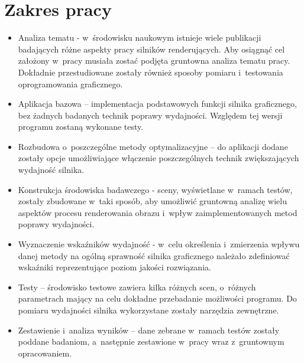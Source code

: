 \documentclass[a4paper,twoside,12pt]{book}
\begin{document}
\section{Zakres pracy}
\begin{itemize}
    \item Analiza tematu - w~środowisku naukowym istnieje wiele publikacji badających różne aspekty pracy silników renderujących. Aby osiągnąć cel założony w~pracy musiała zostać podjęta gruntowna analiza tematu pracy. Dokładnie przestudiowane zostały również sposoby pomiaru i~testowania oprogramowania graficznego.
    \item Aplikacja bazowa – implementacja podstawowych funkcji silnika graficznego, bez żadnych badanych technik poprawy wydajności. Względem tej wersji programu zostaną wykonane testy.
    \item Rozbudowa o~poszczególne metody optymalizacyjne – do aplikacji dodane zostały opcje umożliwiające włączenie poszczególnych technik zwiększających wydajność silnika.
    \item Konstrukcja środowiska badawczego - sceny, wyświetlane w~ramach testów, zostały zbudowane w~taki sposób, aby umożliwić gruntowną analizę wielu aspektów procesu renderowania obrazu i~wpływ zaimplementowanych metod poprawy wydajności.
    \item Wyznaczenie wskaźników wydajność - w~celu określenia i~zmierzenia wpływu danej metody na ogólną sprawność silnika graficznego należało zdefiniować wskaźniki reprezentujące poziom jakości rozwiązania.
    \item Testy – środowisko testowe zawiera kilka różnych scen, o~różnych parametrach mający na celu dokładne przebadanie możliwości programu. Do pomiaru wydajności silnika wykorzystane zostały narzędzia zewnętrzne.
    \item Zestawienie i~analiza wyników – dane zebrane w~ramach testów zostały poddane badaniom, a~następnie zestawione w~pracy wraz z~gruntownym opracowaniem.
\end{itemize}
\end{document}
